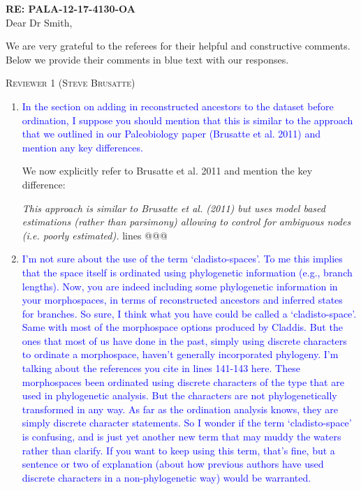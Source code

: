 \documentclass[12pt,letterpaper]{article}
\renewcommand{\section}[1]{%
\bigskip
\begin{center}
\begin{Large}
\normalfont\scshape #1
\medskip
\end{Large}
\end{center}}
\begin{document}
\textbf{RE: PALA-12-17-4130-OA}\\
\bigskip
Dear Dr Smith,\\
\bigskip

We are very grateful to the referees for their helpful and constructive comments. 
Below we provide their comments in blue text with our responses.


%
%


\section{Reviewer 1 (Steve Brusatte)}

\begin{enumerate}

\item{\textcolor{blue}{In the section on adding in reconstructed ancestors to the dataset before ordination, I suppose you should mention that this is similar to the approach that we outlined in our Paleobiology paper (Brusatte et al. 2011) and mention any key differences.}}

We now explicitly refer to Brusatte et al. 2011 and mention the key difference:

\textit{This approach is similar to Brusatte et al. (2011) but uses model based estimations (rather than parsimony) allowing to control for ambiguous nodes (i.e. poorly estimated).} lines @@@

\item{\textcolor{blue}{I'm not sure about the use of the term ‘cladisto-spaces’. To me this implies that the space itself is ordinated using phylogenetic information (e.g., branch lengths). Now, you are indeed including some phylogenetic information in your morphospaces, in terms of reconstructed ancestors and inferred states for branches. So sure, I think what you have could be called a ‘cladisto-space’. Same with most of the morphospace options produced by Claddis. But the ones that most of us have done in the past, simply using discrete characters to ordinate a morphospace, haven't generally incorporated phylogeny. I’m talking about the references you cite in lines 141-143 here. These morphospaces been ordinated using discrete characters of the type that are used in phylogenetic analysis. But the characters are not phylogenetically transformed in any way. As far as the ordination analysis knows, they are simply discrete character statements. So I wonder if the term ‘cladisto-space’ is confusing, and is just yet another new term that may muddy the waters rather than clarify. If you want to keep using this term, that's fine, but a sentence or two of explanation (about how previous authors have used discrete characters in a non-phylogenetic way) would be warranted.}}


\end{enumerate}
\end{document}
